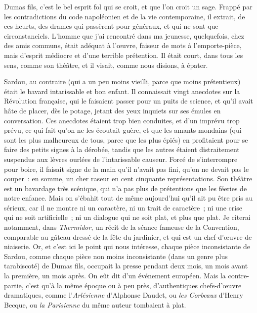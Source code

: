 \documentclass[french,twoside]{book} %
\begin{document}
Dumas fils, c’est le bel esprit fol qui se croit, et que l’on croit un sage. Frappé par les contradictions du code napoléonien et de la vie contemporaine, il extrait, de ces heurts, des drames qui passèrent pour généraux, et qui ne sont que circonstanciels. L’homme que j’ai rencontré dans ma jeunesse, quelquefois, chez des amis communs, était adéquat à l’œuvre, faiseur de mots à l’emporte-pièce, mais d’esprit médiocre et d’une terrible prétention. Il était court, dans tous les sens, comme son théâtre, et il visait, comme nous disions, à épater.\par
Sardou, au contraire (qui a un peu moins vieilli, parce que moins prétentieux) était le bavard intarissable et bon enfant. Il connaissait vingt anecdotes sur la Révolution française, qui le faisaient passer pour un puits de science, et qu’il avait hâte de placer, dès le potage, jetant des yeux inquiets sur ses émules en conversation. Ces anecdotes étaient trop bien conduites, et d’un imprévu trop prévu, ce qui fait qu’on ne les écoutait guère, et que les amants mondains (qui sont les plus malheureux de tous, parce que les plus épiés) en profitaient pour se faire des petits signes à la dérobée, tandis que les autres étaient distraitement suspendus aux lèvres ourlées de l’intarissable causeur. Forcé de s’interrompre pour boire, il faisait signe de la main qu’il n’avait pas fini, qu’on ne devait pas le couper : en somme, un cher raseur en cent cinquante représentations. Son théâtre est un bavardage très scénique, qui n’a pas plus de prétentions que les féeries de notre enfance. Mais on s’ébahit tout de même aujourd’hui qu’il ait pu être pris au sérieux, car il ne montre ni un caractère, ni un trait de caractère ; ni une crise qui ne soit artificielle ; ni un dialogue qui ne soit plat, et plus que plat. Je citerai notamment, dans {\itshape Thermidor}, un récit de la séance fameuse de la Convention, comparable au gâteau dressé de la fête du jardinier, et qui est un chef-d’œuvre de niaiserie. Or, et c’est ici le point qui nous intéresse, chaque pièce inconsistante de Sardou, comme chaque pièce non moins inconsistante (dans un genre plus tarabiscoté) de Dumas fils, occupait la presse pendant deux mois, un mois avant la première, un mois après. On eût dit d’un événement européen. Mais la contre-partie, c’est qu’à la même époque ou à peu près, d’authentiques chefs-d’œuvre dramatiques, comme l’{\itshape Arlésienne} d’Alphonse Daudet, ou {\itshape les Corbeaux} d’Henry Becque, ou {\itshape la Parisienne} du même auteur tombaient à plat.\par
\end{document}
